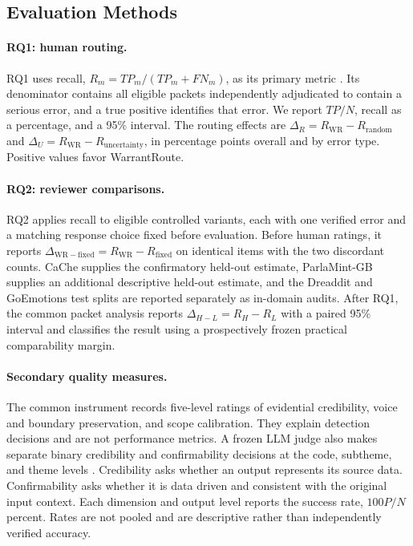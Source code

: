 \subsection{Evaluation Methods}
\label{sec:evaluation_methods}

\paragraph{RQ1: human routing.}
RQ1 uses recall, \(R_m=TP_m/(TP_m+FN_m)\), as its primary metric \citep{dai2023llm}. Its denominator contains all eligible packets independently adjudicated to contain a serious error, and a true positive identifies that error. We report \(TP/N\), recall as a percentage, and a 95\% interval. The routing effects are \(\Delta_R=R_{\mathrm{WR}}-R_{\mathrm{random}}\) and \(\Delta_U=R_{\mathrm{WR}}-R_{\mathrm{uncertainty}}\), in percentage points overall and by error type. Positive values favor WarrantRoute.

\paragraph{RQ2: reviewer comparisons.}
RQ2 applies recall to eligible controlled variants, each with one verified error and a matching response choice fixed before evaluation. Before human ratings, it reports \(\Delta_{\mathrm{WR}-\mathrm{fixed}}=R_{\mathrm{WR}}-R_{\mathrm{fixed}}\) on identical items with the two discordant counts. CaChe supplies the confirmatory held-out estimate, ParlaMint-GB supplies an additional descriptive held-out estimate, and the Dreaddit and GoEmotions test splits are reported separately as in-domain audits. After RQ1, the common packet analysis reports \(\Delta_{H-L}=R_H-R_L\) with a paired 95\% interval and classifies the result using a prospectively frozen practical comparability margin.

\paragraph{Secondary quality measures.}
The common instrument records five-level ratings of evidential credibility, voice and boundary preservation, and scope calibration. They explain detection decisions and are not performance metrics. A frozen LLM judge also makes separate binary credibility and confirmability decisions at the code, subtheme, and theme levels \citep{qiao2025thematiclm,zheng2023judging}. Credibility asks whether an output represents its source data. Confirmability asks whether it is data driven and consistent with the original input context. Each dimension and output level reports the success rate, \(100P/N\) percent. Rates are not pooled and are descriptive rather than independently verified accuracy.


